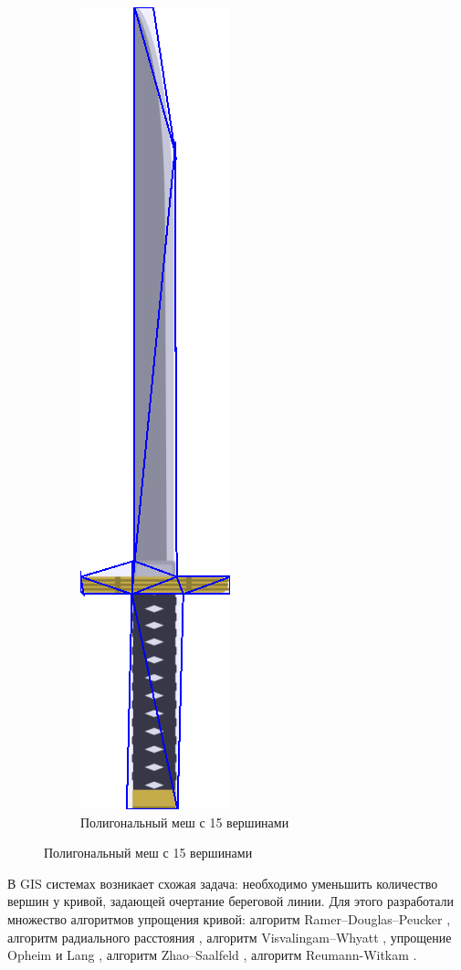 \documentclass{fefu_thesis/cls/fefu}
\begin{document}
\begin{figure}[H]
\begin{subfigure}[c]{.49\linewidth}
            \includegraphics{images/katana_15v.png}
            \caption{Полигональный меш с 15 вершинами}
        \end{subfigure}
    \end{figure}

    В GIS системах возникает схожая задача: необходимо уменьшить количество вершин у кривой, задающей очертание береговой линии. Для этого разработали множество алгоритмов упрощения кривой: алгоритм Ramer–Douglas–Peucker \cite{Ramer}\cite{DouglasPeucker}, алгоритм радиального расстояния \cite{PolylineSimplification}, алгоритм Visvalingam–Whyatt \cite{VisvalingamWhyatt}, упрощение Opheim \cite{Opheim} и Lang \cite{Lang}, алгоритм Zhao–Saalfeld \cite{ZhaoSaalfeld}, алгоритм Reumann-Witkam \cite{ReumannWitkam}.
\end{document}
